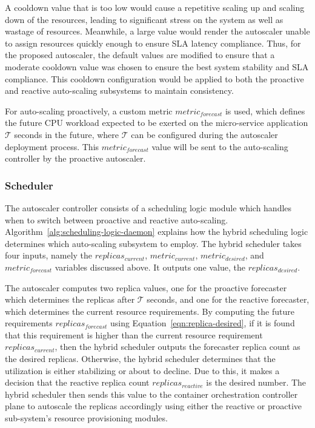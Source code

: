 A cooldown value that is too low would cause a repetitive scaling up and scaling down of the resources, leading to significant stress on the system as well as wastage of resources. Meanwhile, a large value would render the autoscaler unable to assign resources quickly enough to ensure SLA latency compliance. Thus, for the proposed autoscaler, the default values are modified to ensure that a moderate cooldown value was chosen to ensure the best system stability and SLA compliance. This cooldown configuration would be applied to both the proactive and reactive auto-scaling subsystems to maintain consistency.\par

For auto-scaling proactively, a custom metric $metric_{forecast}$ is used, which defines the future CPU workload expected to be exerted on the micro-service application $\mathcal{T}$ seconds in the future, where $\mathcal{T}$ can be configured during the autoscaler deployment process. This $metric_{forecast}$ value will be sent to the auto-scaling controller by the proactive autoscaler.\par

\subsubsection{Scheduler}

The autoscaler controller consists of a scheduling logic module which handles when to switch between proactive and reactive auto-scaling. Algorithm~\ref{alg:scheduling-logic-daemon} explains how the hybrid scheduling logic determines which auto-scaling subsystem to employ. The hybrid scheduler takes four inputs, namely the $replicas_{current}$, $metric_{current}$, $metric_{desired}$, and $metric_{forecast}$ variables discussed above. It outputs one value, the $replicas_{desired}$.\par

The autoscaler computes two replica values, one for the proactive forecaster which determines the replicas after $\mathcal{T}$ seconds, and one for the reactive forecaster, which determines the current resource requirements. By computing the future requirements $replicas_{forecast}$ using Equation~\ref{eqn:replica-desired}, if it is found that this requirement is higher than the current resource requirement $replicas_{current}$, then the hybrid scheduler outputs the forecaster replica count as the desired replicas. Otherwise, the hybrid scheduler determines that the utilization is either stabilizing or about to decline. Due to this, it makes a decision that the reactive replica count $replicas_{reactive}$ is the desired number. The hybrid scheduler then sends this value to the container orchestration controller plane to autoscale the replicas accordingly using either the reactive or proactive sub-system's resource provisioning modules.\par

